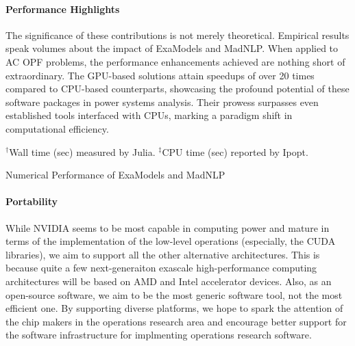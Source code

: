 \documentclass{article}
\begin{document}
\paragraph{Performance Highlights}

The significance of these contributions is not merely theoretical. Empirical results speak volumes about the impact of ExaModels and MadNLP. When applied to AC OPF problems, the performance enhancements achieved are nothing short of extraordinary. The GPU-based solutions attain speedups of over 20 times compared to CPU-based counterparts, showcasing the profound potential of these software packages in power systems analysis. Their prowess surpasses even established tools interfaced with CPUs, marking a paradigm shift in computational efficiency.

\cite{shin2023accelerating}
 
\begin{table}[t]
  \begin{center}
    
    \vspace{-1em}
    \footnotesize
    $^\dag$Wall time (sec) measured by Julia. $^\ddag$CPU time (sec) reported by Ipopt.  \caption{Numerical Performance of ExaModels and MadNLP}
  \end{center}
  \label{tab:num}
\end{table}

\paragraph{Portability}

While NVIDIA seems to be most capable in computing power and mature in terms of the implementation of the low-level operations (especially, the CUDA libraries), we aim to support all the other alternative architectures. This is because quite a few next-generaiton exascale high-performance computing architectures will be based on AMD and Intel accelerator devices. Also, as an open-source software, we aim to be the most generic software tool, not the most efficient one. By supporting diverse platforms, we hope to spark the attention of the chip makers in the operations research area and encourage better support for the software infrastructure for implmenting operations research software. 
\end{document}
